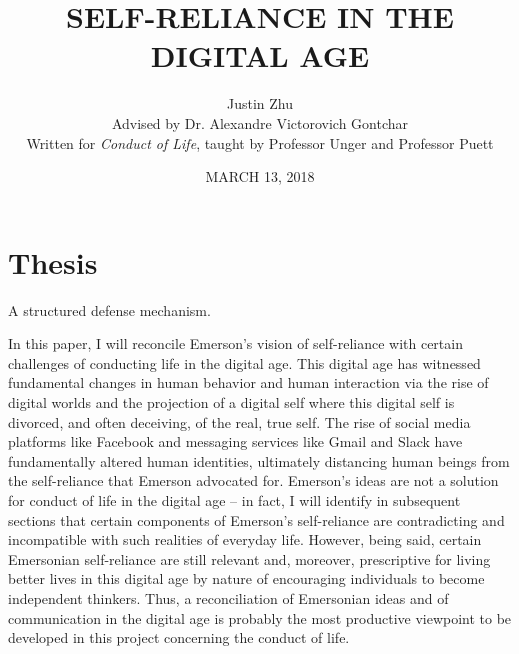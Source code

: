 \documentclass[12pt,letterpaper]{article}
\author{Justin Zhu \\ Advised by Dr. Alexandre Victorovich Gontchar \\ Written for \textit{Conduct of Life}, taught by Professor Unger and Professor Puett}
\title{SELF-RELIANCE IN THE DIGITAL AGE}
\date{MARCH 13, 2018}
\begin{document}
\pagestyle{empty}
\begin{titlepage}
\pagestyle{empty}
\maketitle
\pagestyle{empty}
\pagebreak
\tableofcontents
\end{titlepage}
\pagebreak
\pagestyle{plain}
\setcounter{page}{1}
\section{Thesis}

A structured defense mechanism.

In this paper, I will reconcile Emerson's vision of
self-reliance with certain challenges of conducting life in the digital age.
This digital age has witnessed fundamental changes
in human behavior and human interaction via the rise of
digital worlds and the projection of a digital self where
this digital self is divorced, and often deceiving, of the real, true self.    The rise
of social media platforms like Facebook and messaging services like Gmail and Slack have fundamentally altered human identities, ultimately distancing human beings from the self-reliance that Emerson advocated for.  Emerson's ideas are not a solution for conduct of life in the digital age -- in fact, I will identify in subsequent sections that certain components of Emerson's self-reliance are contradicting and incompatible with such realities of everyday life.  However, being said, certain Emersonian self-reliance are still relevant and, moreover, prescriptive for living better lives in this digital age by nature of encouraging individuals to become independent thinkers.  Thus, a reconciliation of Emersonian ideas and of communication in the digital age is probably the most productive viewpoint to be developed in this project concerning the conduct of life.
\end{document}

